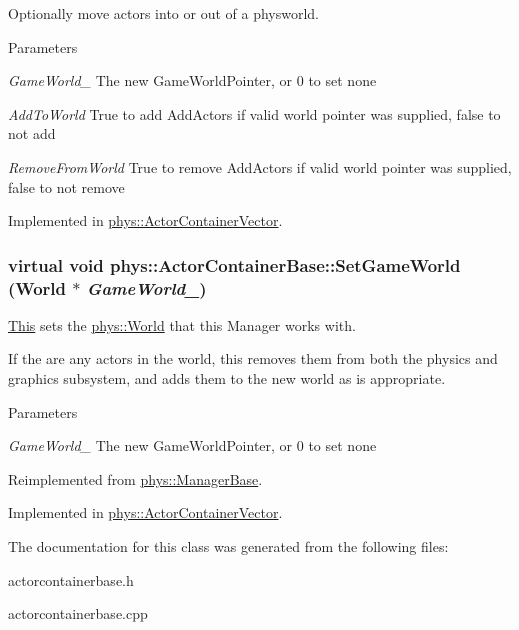 Optionally move actors into or out of a physworld. 


\begin{DoxyParams}{Parameters}
\item[{\em GameWorld\_\-}]The new GameWorldPointer, or 0 to set none \item[{\em AddToWorld}]True to add AddActors if valid world pointer was supplied, false to not add \item[{\em RemoveFromWorld}]True to remove AddActors if valid world pointer was supplied, false to not remove \end{DoxyParams}


Implemented in \hyperlink{classphys_1_1ActorContainerVector_a721d0cde6fc4f1e8d3b33867cd5c82df}{phys::ActorContainerVector}.

\hypertarget{classphys_1_1ActorContainerBase_ae0cb5c288f17507247dd98d3a2466876}{
\subsubsection[{SetGameWorld}]{\setlength{\rightskip}{0pt plus 5cm}virtual void phys::ActorContainerBase::SetGameWorld ({\bf World} $\ast$ {\em GameWorld\_\-})}}
\label{d1/d00/classphys_1_1ActorContainerBase_ae0cb5c288f17507247dd98d3a2466876}


\hyperlink{structThis}{This} sets the \hyperlink{classphys_1_1World}{phys::World} that this Manager works with. 

If the are any actors in the world, this removes them from both the physics and graphics subsystem, and adds them to the new world as is appropriate. 
\begin{DoxyParams}{Parameters}
\item[{\em GameWorld\_\-}]The new GameWorldPointer, or 0 to set none \end{DoxyParams}


Reimplemented from \hyperlink{classphys_1_1ManagerBase_a97eb1e77c1f7a0925fc623836368a262}{phys::ManagerBase}.



Implemented in \hyperlink{classphys_1_1ActorContainerVector_ab4c1394254057465f7a2f89b87dc49aa}{phys::ActorContainerVector}.



The documentation for this class was generated from the following files:\begin{DoxyCompactItemize}
\item 
actorcontainerbase.h\item 
actorcontainerbase.cpp\end{DoxyCompactItemize}
